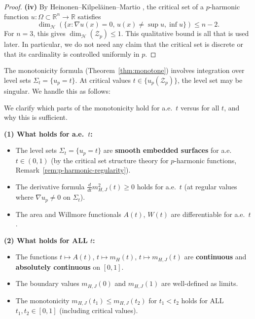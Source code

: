 \begin{remark}
\begin{proof}
\textbf{(iv)} By Heinonen--Kilpel\"ainen--Martio \cite[Theorem 7.46]{heinonen1993}, the critical set of a $p$-harmonic function $u: \Omega \subset \mathbb{R}^n \to \mathbb{R}$ satisfies
\[
\dim_{\mathcal{H}}(\{x : \nabla u(x) = 0, \, u(x) \neq \sup u, \inf u\}) \leq n - 2.
\]
For $n = 3$, this gives $\dim_{\mathcal{H}}(\mathcal{Z}_p) \leq 1$. This qualitative bound is all that is used later. In particular, we do not need any claim that the critical set is discrete or that its cardinality is controlled uniformly in $p$.
\end{proof}

\begin{remark}\label{rem:critical-points}
The monotonicity formula (Theorem~\ref{thm:monotone}) involves integration over level sets $\Sigma_t = \{u_p = t\}$. At critical values $t \in \{u_p(\mathcal{Z}_p)\}$, the level set may be singular. We handle this as follows:
\end{remark}

\begin{remark}\label{rem:ae-vs-all}
We clarify which parts of the monotonicity hold for a.e.\ $t$ versus for all $t$, and why this is sufficient.

\textbf{(1) What holds for a.e.\ $t$:}
\begin{itemize}
    \item The level sets $\Sigma_t = \{u_p = t\}$ are \textbf{smooth embedded surfaces} for a.e.\ $t \in (0,1)$ (by the critical set structure theory for $p$-harmonic functions, Remark~\ref{rem:p-harmonic-regularity}).
    \item The derivative formula $\frac{d}{dt}m_{H,J}^2(t) \geq 0$ holds for a.e.\ $t$ (at regular values where $\nabla u_p \neq 0$ on $\Sigma_t$).
    \item The area and Willmore functionals $A(t)$, $W(t)$ are differentiable for a.e.\ $t$.
\end{itemize}

\textbf{(2) What holds for ALL $t$:}
\begin{itemize}
    \item The functions $t \mapsto A(t)$, $t \mapsto m_H(t)$, $t \mapsto m_{H,J}(t)$ are \textbf{continuous} and \textbf{absolutely continuous} on $[0,1]$.
    \item The boundary values $m_{H,J}(0)$ and $m_{H,J}(1)$ are well-defined as limits.
    \item The monotonicity $m_{H,J}(t_1) \leq m_{H,J}(t_2)$ for $t_1 < t_2$ holds for ALL $t_1, t_2 \in [0,1]$ (including critical values).
\end{itemize}


\end{remark}
\end{remark}
